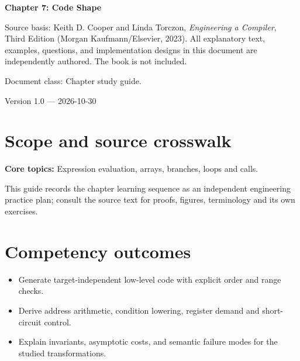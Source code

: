 \documentclass[10pt,letterpaper]{article}
\begin{document}
\begin{titlepage}
\centering\vspace*{1.0in}
{\Huge\bfseries\textcolor{CompilerBlue}{Chapter 7: Code Shape}\par}
\vspace{.22in}{\Large Critical reading, original exercises, evidence and review\par}
\vspace{.4in}{\large Compiler Engineering Documentation Suite\par}
\vfill
\begin{minipage}{.86\linewidth}\small
Source basis: Keith D. Cooper and Linda Torczon, \emph{Engineering a Compiler}, Third Edition (Morgan Kaufmann/Elsevier, 2023). All explanatory text, examples, questions, and implementation designs in this document are independently authored. The book is not included.\par\medskip
Document class: Chapter study guide.
\end{minipage}
\vfill\textcolor{CompilerGray}{Version 1.0 --- 2026-10-30}\par
\end{titlepage}
\tableofcontents\clearpage
\section{Scope and source crosswalk}
\textbf{Core topics:} Expression evaluation, arrays, branches, loops and calls.

This guide records the chapter learning sequence as an independent engineering practice plan; consult the source text for proofs, figures, terminology and its own exercises.

\section{Competency outcomes}
\begin{itemize}
\item Generate target-independent low-level code with explicit order and range checks.
\item Derive address arithmetic, condition lowering, register demand and short-circuit control.
\item Explain invariants, asymptotic costs, and semantic failure modes for the studied transformations.
\end{itemize}
\end{document}

